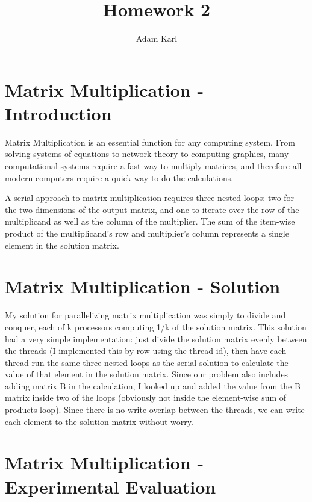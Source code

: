 \documentclass[a4paper]{article}
\title{Homework 2}
\author{Adam Karl}
\begin{document}
\maketitle

\section{Matrix Multiplication - Introduction}
Matrix Multiplication is an essential function for any computing system. From solving systems of equations to network theory to computing graphics, many computational systems require a fast way to multiply matrices, and therefore all modern computers require a quick way to do the calculations.


A serial approach to matrix multiplication requires three nested loops: two for the two dimensions of the output matrix, and one to iterate over the row of the multiplicand as well as the column of the multiplier. The sum of the item-wise product of the multiplicand's row and multiplier's column represents a single element in the solution matrix.

\section{Matrix Multiplication - Solution}

My solution for parallelizing matrix multiplication was simply to divide and conquer, each of k processors computing 1/k of the solution matrix. This solution had a very simple implementation: just divide the solution matrix evenly between the threads (I implemented this by row using the thread id), then have each thread run the same three nested loops as the serial solution to calculate the value of that element in the solution matrix. Since our problem also includes adding matrix B in the calculation, I looked up and added the value from the B matrix inside two of the loops (obviously not inside the element-wise sum of products loop). Since there is no write overlap between the threads, we can write each element to the solution matrix without worry.

\section{Matrix Multiplication - Experimental Evaluation}
\end{document}
